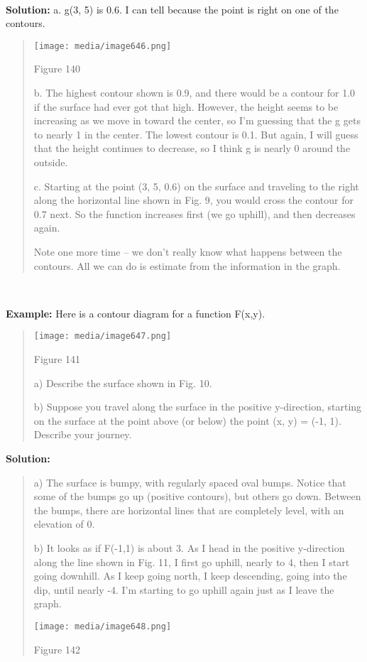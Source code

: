 \textbf{\\
}

\textbf{Solution:} a. g(3, 5) is 0.6. I can tell because the point is
right on one of the contours.

\begin{quote}
\texttt{[image: media/image646.png]}

Figure 140

b. The highest contour shown is 0.9, and there would be a contour for
1.0 if the surface had ever got that high. However, the height seems to
be increasing as we move in toward the center, so I'm guessing that the
g gets to nearly 1 in the center. The lowest contour is 0.1. But again,
I will guess that the height continues to decrease, so I think g is
nearly 0 around the outside.

c. Starting at the point (3, 5, 0.6) on the surface and traveling to the
right along the horizontal line shown in Fig. 9, you would cross the
contour for 0.7 next. So the function increases first (we go uphill),
and then decreases again.

Note one more time -- we don't really know what happens between the
contours. All we can do is estimate from the information in the graph.
\end{quote}

\textbf{\\
}

\textbf{Example:} Here is a contour diagram for a function F(x,y).

\begin{quote}
\texttt{[image: media/image647.png]}

Figure 141

a) Describe the surface shown in Fig. 10.

b) Suppose you travel along the surface in the positive y-direction,
starting on the surface at the point above (or below) the point (x, y) =
(-1, 1). Describe your journey.
\end{quote}

\textbf{Solution:}

\begin{quote}
a) The surface is bumpy, with regularly spaced oval bumps. Notice that
some of the bumps go up (positive contours), but others go down. Between
the bumps, there are horizontal lines that are completely level, with an
elevation of 0.

b) It looks as if F(-1,1) is about 3. As I head in the positive
y-direction along the line shown in Fig. 11, I first go uphill, nearly
to 4, then I start going downhill. As I keep going north, I keep
descending, going into the dip, until nearly -4. I'm starting to go
uphill again just as I leave the graph.

\texttt{[image: media/image648.png]}

Figure 142
\end{quote}

